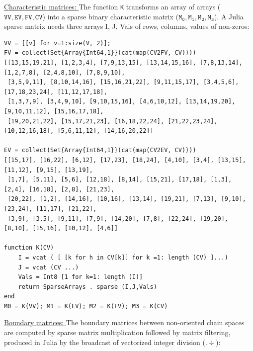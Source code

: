 \documentclass{article}
\begin{document}
\vspace{10pt}
\noindent\underline{
Characteristic matrices:
}\vspace{0.2em}\newline 
The function \texttt{K} transforms an array of arrays ($\mathtt{VV, EV, FV, CV}$) into a sparse binary characteristic matrix
($\mathtt{M_0, M_1, M_2, M_3}$). A Julia sparse matrix needs three arrays I, J, Vals of rows, columns, values of non-zeros:

\begin{Verbatim}[fontsize=\footnotesize]
VV = [[v] for v=1:size(V, 2)];
FV = collect(Set{Array{Int64,1}}(cat(map(CV2FV, CV))))
[[13,15,19,21], [1,2,3,4], [7,9,13,15], [13,14,15,16], [7,8,13,14], [1,2,7,8], [2,4,8,10], [7,8,9,10], 
 [3,5,9,11], [8,10,14,16], [15,16,21,22], [9,11,15,17], [3,4,5,6], [17,18,23,24], [11,12,17,18], 
 [1,3,7,9], [3,4,9,10], [9,10,15,16], [4,6,10,12], [13,14,19,20], [9,10,11,12], [15,16,17,18], 
 [19,20,21,22], [15,17,21,23], [16,18,22,24], [21,22,23,24], [10,12,16,18], [5,6,11,12], [14,16,20,22]]

EV = collect(Set{Array{Int64,1}}(cat(map(CV2EV, CV))))
[[15,17], [16,22], [6,12], [17,23], [18,24], [4,10], [3,4], [13,15], [11,12], [9,15], [13,19],
 [1,7], [5,11], [5,6], [12,18], [8,14], [15,21], [17,18], [1,3], [2,4], [16,18], [2,8], [21,23],
 [20,22], [1,2], [14,16], [10,16], [13,14], [19,21], [7,13], [9,10], [23,24], [11,17], [21,22],
 [3,9], [3,5], [9,11], [7,9], [14,20], [7,8], [22,24], [19,20], [8,10], [15,16], [10,12], [4,6]]

function K(CV)
    I = vcat ( [ [k for h in CV[k]] for k =1: length (CV) ]...)
    J = vcat (CV ...)
    Vals = Int8 [1 for k=1: length (I)]
    return SparseArrays . sparse (I,J,Vals)
end
M0 = K(VV); M1 = K(EV); M2 = K(FV); M3 = K(CV)
\end{Verbatim}

\vspace{10pt}
\noindent\underline{
Boundary matrices:
}\vspace{0.2em}\newline 
The boundary matrices between non-oriented chain spaces are computed by sparse matrix multiplication
followed by matrix filtering, produced in Julia by the broadcast of vectorized integer division ($.\div$):
\end{document}
